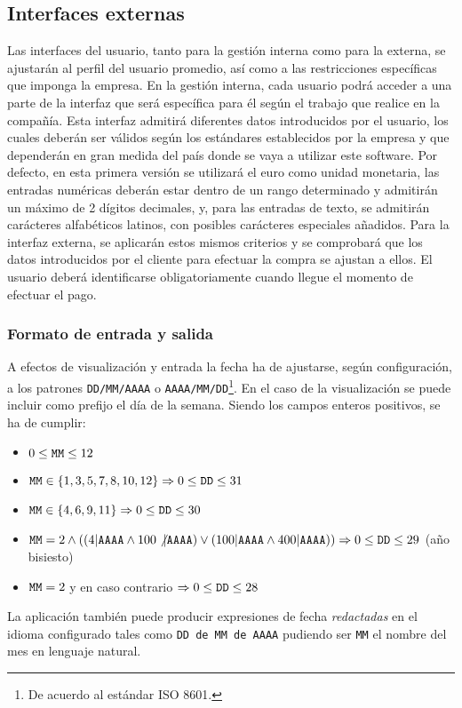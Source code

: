 \documentclass[11pt, a4paper, twoside, titlepage]{article}
\begin{document}
		\subsection{Interfaces externas}
			Las interfaces del usuario, tanto para la gestión interna como para la externa, se ajustarán al perfil del usuario promedio, así como a las restricciones específicas que imponga la empresa. En la gestión interna, cada usuario podrá acceder a una parte de la interfaz que será específica para él según el trabajo que realice en la compañía. Esta interfaz admitirá diferentes datos introducidos por el usuario, los cuales deberán ser válidos según los estándares establecidos por la empresa y que dependerán en gran medida del país donde se vaya a utilizar este software. Por defecto, en esta primera versión se utilizará el euro como unidad monetaria, las entradas numéricas deberán estar dentro de un rango determinado y admitirán un máximo de 2 dígitos decimales, y, para las entradas de texto, se admitirán carácteres alfabéticos latinos, con posibles carácteres especiales añadidos. Para la interfaz externa, se aplicarán estos mismos criterios y se comprobará que los datos introducidos por el cliente para efectuar la compra se ajustan a ellos. El usuario deberá identificarse obligatoriamente cuando llegue el momento de efectuar el pago.
			

		\subsubsection{Formato de entrada y salida}

				A efectos de visualización y entrada la fecha ha de ajustarse, según configuración, a los patrones \verb|DD/MM/AAAA| o \verb|AAAA/MM/DD|\footnote{De acuerdo al estándar ISO 8601.}. En el caso de la visualización se puede incluir como prefijo el día de la semana. Siendo los campos enteros positivos, se ha de cumplir:
				\begin{itemize}
					\item $0 \leq \verb|MM| \leq 12$
					\item $\verb|MM| \in \{1, 3, 5, 7, 8, 10, 12\} \Rightarrow 0 \leq \verb|DD| \leq 31$
					\item $\verb|MM| \in \{4, 6, 9, 11\} \Rightarrow 0 \leq \verb|DD| \leq 30$ 
					\item $\verb|MM| = 2 \wedge ((4 | \verb|AAAA| \wedge 100 \not| \verb|AAAA|) \vee (100 | \verb|AAAA| \wedge 400 | \verb|AAAA|)) \Rightarrow 0 \leq \verb|DD| \leq 29$ (año bisiesto)
					\item $\verb|MM| = 2$ y en caso contrario $\Rightarrow 0 \leq \verb|DD| \leq 28$
				\end{itemize}
			La aplicación también puede producir expresiones de fecha \textit{redactadas} en el idioma configurado tales como \verb|DD de MM de AAAA| pudiendo ser \verb|MM| el nombre del mes en lenguaje natural.\\
\end{document}
